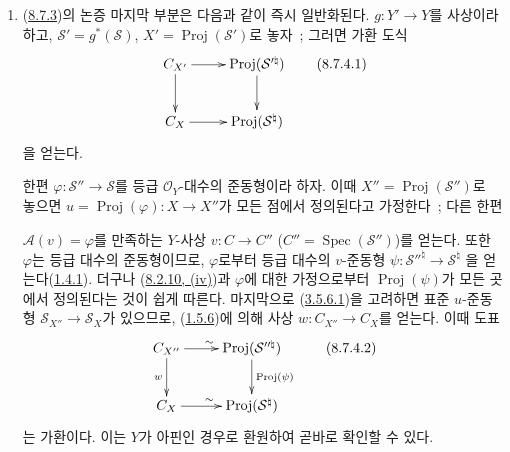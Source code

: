 \begin{remark}[8.7.4]
\label{II.8.7.4-ko}
\begin{enumerate}
  \item[\rm{(i)}] (\hyperref[II.8.7.3-ko]{8.7.3})의 논증 마지막 부분은
  다음과 같이 즉시 일반화된다. $g:Y'\to Y$를 사상이라 하고,
  $\mathcal{S}'=g^*(\mathcal{S})$, $X'=\operatorname{Proj}(\mathcal{S}')$로
  놓자~; 그러면 가환 도식
  \begin{equation}
  \label{II.8.7.4.1-ko}
    \xymatrix{
      C_{X'}\ar[r]\ar[d] &
      \operatorname{Proj}(\mathcal{S}'^{\natural})\ar[d]\\
      C_X\ar[r] & \operatorname{Proj}(\mathcal{S}^{\natural})
    }
  \tag{8.7.4.1}
  \end{equation}
  을 얻는다.

  한편 $\varphi:\mathcal{S}''\to\mathcal{S}$를 등급
  $\mathcal{O}_Y$-대수의 준동형이라 하자. 이때
  $X''=\operatorname{Proj}(\mathcal{S}'')$로 놓으면
  $u=\operatorname{Proj}(\varphi):X\to X''$가 모든 점에서 정의된다고
  가정한다~; 다른 한편

  $\mathcal{A}(v)=\varphi$를 만족하는 $Y$-사상 $v:C\to C''$
  ($C''=\operatorname{Spec}(\mathcal{S}'')$)를 얻는다. 또한
  $\varphi$는 등급 대수의 준동형이므로, $\varphi$로부터 등급 대수의
  $v$-준동형
  $\psi:\mathcal{S}''^{\natural}\to\mathcal{S}^{\natural}$
  을 얻는다(\hyperref[II.1.4.1-ko]{1.4.1}). 더구나
  (\hyperref[II.8.2.10-ko]{8.2.10, (iv)})과 $\varphi$에 대한 가정으로부터
  $\operatorname{Proj}(\psi)$가 모든 곳에서 정의된다는 것이 쉽게 따른다.
  마지막으로 (\hyperref[II.3.5.6.1-ko]{3.5.6.1})을 고려하면 표준
  $u$-준동형 $\mathcal{S}_{X''}\to\mathcal{S}_X$가 있으므로,
  (\hyperref[II.1.5.6-ko]{1.5.6})에 의해 사상 $w:C_{X''}\to C_X$를 얻는다.
  이때 도표
  \begin{equation}
  \label{II.8.7.4.2-ko}
    \xymatrix{
      C_{X''}\ar[r]^{\sim}\ar[d]_{w} &
      \operatorname{Proj}(\mathcal{S}''^{\natural})
        \ar[d]^{\operatorname{Proj}(\psi)}\\
      C_X\ar[r]^{\sim} & \operatorname{Proj}(\mathcal{S}^{\natural})
    }
  \tag{8.7.4.2}
  \end{equation}
  는 가환이다. 이는 $Y$가 아핀인 경우로 환원하여 곧바로 확인할 수 있다.


\end{enumerate}
\end{remark}
